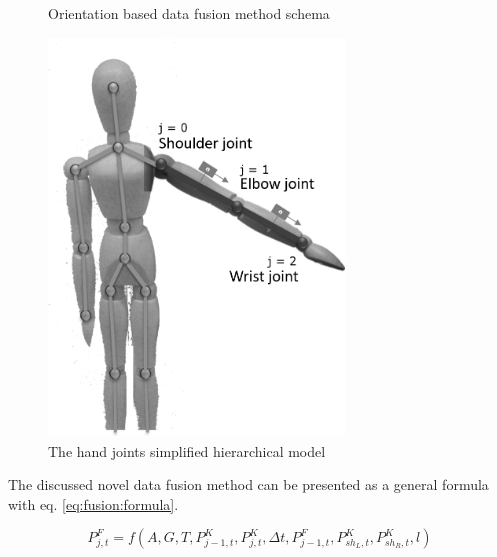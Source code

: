 \documentclass[sensors,article,submit,moreauthors,pdftex,10pt,a4paper]{mdpi}
\begin{document}
\begin{minipage}{\linewidth}
	\centering
	\begin{minipage}[b]{0.45\linewidth}
		\begin{figure}[H] %
			\scalebox{0.47}{
				
			}
			\caption{Orientation based data fusion method schema}
			\label{fig:methodPhases}
		\end{figure}
	\end{minipage}
	\hfill
	\begin{minipage}[b]{0.45\linewidth}
		\begin{figure}[H] %
			\includegraphics[width=0.7\textwidth]{Figure9.png}
			\caption{The hand joints simplified hierarchical model}		
			\label{fig:hybrid:jointsHierarchy}	
		\end{figure}
	\end{minipage}
\end{minipage}
		
The discussed novel data fusion method can be presented as a general formula with eq. \ref{eq:fusion:formula}.
		
\begin{equation}
	P^F_{j,t} = f(A,G,T,P_{j-1,t}^K,P_{j,t}^K,\Delta t, P^F_{j-1,t}, P^K_{sh_L,t},P^K_{sh_R,t},l) 
	\label{eq:fusion:formula}
\end{equation}
		
\end{document}
